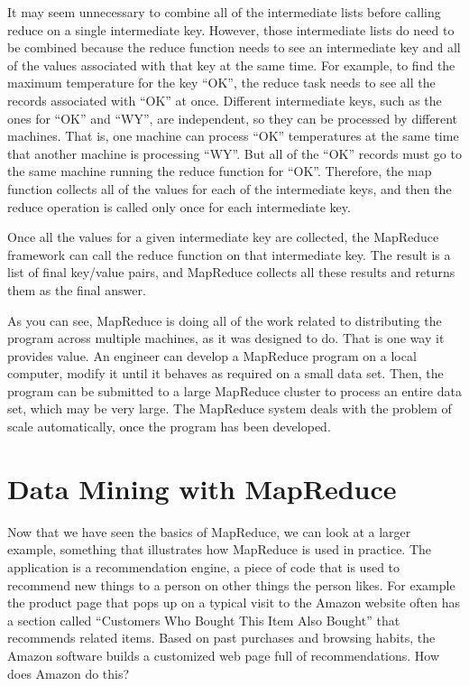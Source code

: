 It may seem unnecessary to combine all of the intermediate lists
before calling reduce on a single intermediate key.  
However, those intermediate lists do need to be combined because 
the reduce function needs to see an intermediate key and all 
of the values associated with that key at the same time. For example,
to find the maximum temperature for the key ``OK'', the reduce
task needs to see all the records associated with ``OK'' at once.
Different intermediate keys, such as the ones for ``OK'' and ``WY'',
are independent, so they can be processed by different machines.
That is, one machine can process ``OK'' temperatures at the same
time that another machine is processing ``WY''.
But all of the ``OK'' records must go to the same machine running
the reduce function for ``OK''.
Therefore, the map function collects all of the values for
each of the intermediate keys, and then the reduce operation is
called only once for each intermediate key.

Once all the values for a given intermediate key are
collected, the MapReduce framework can call the reduce
function on that intermediate key.  The result is a list of
final key/value pairs, and MapReduce collects all these
results and returns them as the final answer.

As you can see, MapReduce is doing all of the work
related to distributing the program across multiple machines,
as it was designed to do.
That is one way it provides value. 
An engineer can develop a MapReduce program on
a local computer, modify it until it behaves as
required on a small data set.  
Then, the program can be submitted to a large MapReduce cluster
to process an entire data set, which may be very large.
The MapReduce system deals with the problem of scale
automatically, once the program has been developed.

\section{Data Mining with MapReduce}

Now that we have seen the basics of MapReduce, we can look at
a larger example, something that illustrates how MapReduce is
used in practice.  The application is a recommendation engine, 
a piece of code that is used to recommend new things to a person
on other things the person likes.  
For example the product page that pops up on a typical visit to
the Amazon website often has a section called ``Customers Who Bought
This Item Also Bought'' that recommends related items.  
Based on past purchases and browsing habits, the Amazon software 
builds a customized web page full of recommendations.
How does Amazon do this?

